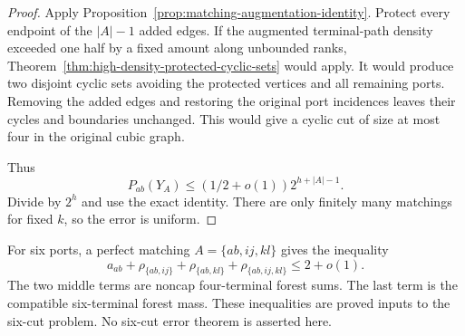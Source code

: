 \begin{proof}
Apply Proposition~\ref{prop:matching-augmentation-identity}.
Protect every endpoint of the $|A|-1$ added edges.
If the augmented terminal-path density exceeded one half by a fixed amount along unbounded ranks, Theorem~\ref{thm:high-density-protected-cyclic-sets} would apply.
It would produce two disjoint cyclic sets avoiding the protected vertices and all remaining ports.
Removing the added edges and restoring the original port incidences leaves their cycles and boundaries unchanged.
This would give a cyclic cut of size at most four in the original cubic graph.

Thus
\[
 P_{ab}(Y_A)\le(1/2+o(1))2^{h+|A|-1}.
\]
Divide by $2^h$ and use the exact identity.
There are only finitely many matchings for fixed $k$, so the error is uniform.
\end{proof}

For six ports, a perfect matching $A=\{ab,ij,kl\}$ gives the inequality
\[
 a_{ab}
 +\rho_{\{ab,ij\}}
 +\rho_{\{ab,kl\}}
 +\rho_{\{ab,ij,kl\}}
 \le2+o(1).
\]
The two middle terms are noncap four-terminal forest sums.
The last term is the compatible six-terminal forest mass.
These inequalities are proved inputs to the six-cut problem.
No six-cut error theorem is asserted here.
